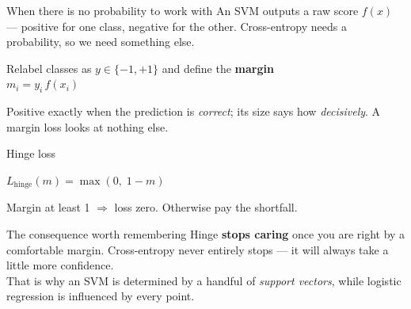 \documentclass[aspectratio=169]{beamer}
\begin{document}
\begin{frame}{When there is no probability to work with}
  An SVM outputs a raw score $f(x)$ --- positive for one class, negative for
  the other. Cross-entropy needs a probability, so we need something else.
  \vspace{0.8em}
  \begin{center}
    Relabel classes as $y \in \{-1, +1\}$ and define the \textbf{margin}\\[0.4em]
    \Large $m_i = y_i \, f(x_i)$
  \end{center}
  \vspace{0.8em}
  \begin{center}
    \small Positive exactly when the prediction is \emph{correct};
    its size says how \emph{decisively}. A margin loss looks at nothing else.
  \end{center}
\end{frame}

\begin{frame}{Hinge loss}
  \begin{center}
    \Large $L_{\mathrm{hinge}}(m) = \max(0,\; 1 - m)$
  \end{center}
  \vspace{0.6em}
  \begin{center}
    Margin at least 1 $\Rightarrow$ loss zero. Otherwise pay the shortfall.
  \end{center}
  \vspace{0.8em}
  \begin{alertblock}{The consequence worth remembering}
    Hinge \textbf{stops caring} once you are right by a comfortable margin.
    Cross-entropy never entirely stops --- it will always take a little more
    confidence.\\[0.4em]
    That is why an SVM is determined by a handful of \emph{support vectors},
    while logistic regression is influenced by every point.
  \end{alertblock}
\end{frame}
\end{document}
